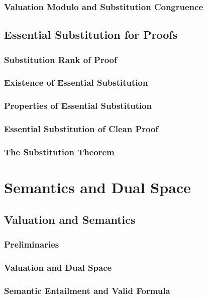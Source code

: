\documentclass{report}
\begin{document}
    \subsection{Valuation Modulo and Substitution Congruence}
      
\section{Essential Substitution for Proofs}
    \subsection{Substitution Rank of Proof}
      
    \subsection{Existence of Essential Substitution}
      
    \subsection{Properties of Essential Substitution}
      
    \subsection{Essential Substitution of Clean Proof}
      
    \subsection{The Substitution Theorem}
      
\chapter{Semantics and Dual Space}
\section{Valuation and Semantics}
    \subsection{Preliminaries}
      
    \subsection{Valuation and Dual Space}
      
    \subsection{Semantic Entailment and Valid Formula}
      
\end{document}
